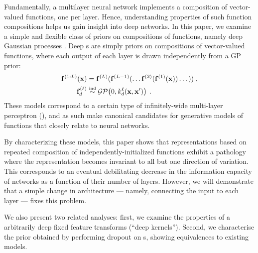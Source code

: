 \documentclass[twoside]{article}
\makeatletter
\newlength{\nonHumbleHeight}
\def\@humbleformat#1{{\settoheight{\nonHumbleHeight}{#1}\resizebox{!}{0.94\nonHumbleHeight}{#1}}}%
\newcommand\humble[1]{{\@humbleformat{#1}}}%
\newcommand{\gp}{{\humble{GP}}}
\newcommand{\MLP}{{\humble{MLP}}}
\newcommand{\layerindex}{\ell}
\makeatother
\begin{document}
Fundamentally, a multilayer neural network implements a composition of vector-valued functions, one per layer.
Hence, understanding properties of such function compositions helps us gain insight into deep networks.
In this paper, we examine a simple and flexible class of priors on compositions of functions, namely deep Gaussian processes \citep{damianou2012deep}.
Deep \gp{}s are simply priors on compositions of vector-valued functions, where each output of each layer is drawn independently from a GP prior:
%
\begin{align}
\vf^{(1:L)}(\vx) & = \vf^{(L)}(\vf^{(L-1)}(\dots \vf^{(2)}(\vf^{(1)}(\vx)) \dots)) \;, \\
\vf_d^{(\layerindex)} & \simind \GPt{0}{k^\layerindex_d(\vx, \vx')} \:.
\end{align}
%
These models correspond to a certain type of infinitely-wide multi-layer perceptron (\MLP{}), and as such make canonical candidates for generative models of functions that closely relate to neural networks.

By characterizing these models, this paper shows that representations based on repeated composition of independently-initialized functions exhibit a pathology where the representation becomes invariant to all but one direction of variation. This corresponds to an eventual debilitating decrease in the information capacity of networks as a function of their number of layers. However, we will demonstrate that a simple change in architecture --- namely, connecting the input to each layer --- fixes this problem. 

We also present two related analyses:  first, we examine the properties of a arbitrarily deep fixed feature transforms (``deep kernels'').  Second, we characterise the prior obtained by performing dropout on \gp{}s, showing equivalences to existing models.

\end{document}
